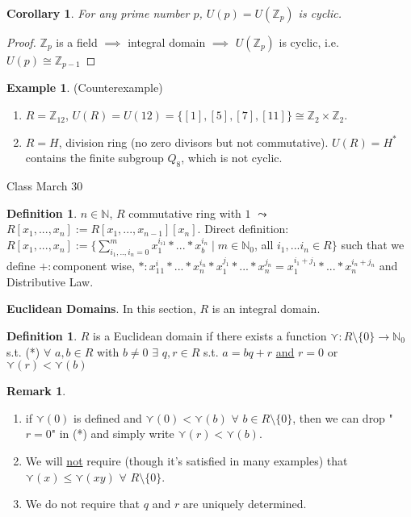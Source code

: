 \documentclass[11pt]{article}
\newtheorem{cor}[thm]{Corollary}
\theoremstyle{definition}
\newtheorem{definition}[thm]{Definition}
\newtheorem{example}[thm]{Example}
\newtheorem{remark}[thm]{Remark}
\numberwithin{equation}{section}
\newcommand{\Z}{\mathbb{Z}}
\newcommand{\N}{\mathbb{N}} %
\begin{document}
\begin{cor}
For any prime number $p$, $U(p) = U(\Z_{p})$ is cyclic.
\end{cor}

\begin{proof}
$\Z_{p}$ is a field $\implies$ integral domain $\implies$ $U(\Z_{p})$ is cyclic, i.e. $U(p) \cong \Z_{p-1}$
\end{proof}

\begin{example}
(Counterexample) \begin{enumerate}
    \item $R = \Z_{12}$, $U(R) = U(12) = \{[1], [5], [7], [11]\} \cong \Z_{2} \times \Z_{2}$.
    \item $R = H$, division ring (no zero divisors but not commutative). $U(R) = H^{*}$ contains the finite subgroup $Q_{8}$, which is not cyclic.
\end{enumerate}
\end{example}

\begin{center}
{\sf\LARGE Class March 30}
\end{center}

\begin{definition}
$n \in \N$, $R$ commutative ring with $1$ $\leadsto$ $R[x_{1},...,x_{n}] := R[x_{1},...,x_{n-1}][x_{n}]$. Direct definition: $R[x_{1},...,x_{n}]:= \{\sum_{i_{1},..,i_{n}=0}^{m}x_{1}^{i_{i1}}*...*x_{b}^{i_{n}} \mid m \in \N_{0}$, all $i_{1},...i_{n} \in R\}$ such that we define $+: $component wise, $*: x_{1}^i_{1}*...*x_{n}^{i_{n}}*x_{1}^{j_{1}}*...*x_{n}^{j_{n}} = x_{1}^{i_{1}+j_{1}}*...*x_{n}^{i_{n}+j_{n}}$ and Distributive Law.
\end{definition}

\textbf{Euclidean Domains}. In this section, $R$ is an integral domain.

\begin{definition}
$R$ is a Euclidean domain if there exists a function $\curlyvee: R \setminus \{0\} \rightarrow \N_{0}$ s.t. (*) $\forall$ $a, b \in R$ with $b \neq 0$ $\exists$ $q, r \in R$ s.t. $a = bq + r$ \underline{and} $r = 0$ or $\curlyvee(r) < \curlyvee(b)$
\end{definition}

\begin{remark}
\begin{enumerate}
    \item if $\curlyvee(0)$ is defined and $\curlyvee(0) < \curlyvee(b)$ $\forall$ $b \in R \setminus \{0\}$, then we can drop "$r = 0$" in (*) and simply write $\curlyvee(r) < \curlyvee(b)$.
    \item We will \underline{not} require (though it's satisfied in many examples) that $\curlyvee(x) \leq \curlyvee(xy)$ $\forall$ $R \setminus \{0\}$.
    \item We do not require that $q$ and $r$ are uniquely determined.
\end{enumerate}
\end{remark}
\end{document}
